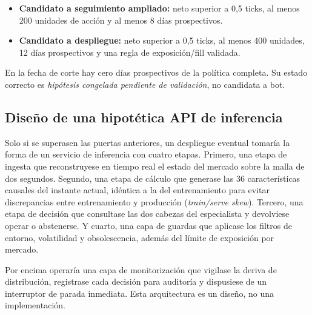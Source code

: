 \begin{itemize}[noitemsep]
  \item \textbf{Candidato a seguimiento ampliado:} neto superior a 0,5 ticks, al menos 200
  unidades de acción y al menos 8 días prospectivos.
  \item \textbf{Candidato a despliegue:} neto superior a 0,5 ticks, al menos 400 unidades,
  12 días prospectivos y una regla de exposición/fill validada.
\end{itemize}

En la fecha de corte hay cero días prospectivos de la política completa. Su estado correcto
es \emph{hipótesis congelada pendiente de validación}, no candidata a bot.

\subsection{Diseño de una hipotética API de inferencia}

Solo si se superasen las puertas anteriores, un despliegue eventual tomaría la forma de un
servicio de inferencia con cuatro etapas. Primero, una etapa de ingesta que reconstruyese en
tiempo real el estado del mercado sobre la malla de dos segundos. Segundo, una etapa de
cálculo que generase las 36 características causales del instante actual, idéntica a la del
entrenamiento para evitar discrepancias entre entrenamiento y producción
(\emph{train/serve skew}). Tercero, una etapa de decisión que consultase las dos cabezas del
especialista y devolviese operar o abstenerse. Y cuarto, una capa de guardas que aplicase los
filtros de entorno, volatilidad y obsolescencia, además del límite de exposición por mercado.

Por encima operaría una capa de monitorización que vigilase la deriva de distribución,
registrase cada decisión para auditoría y dispusiese de un interruptor de parada inmediata.
Esta arquitectura es un diseño, no una implementación.
